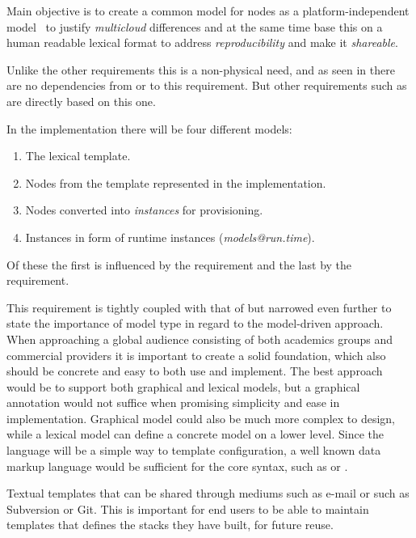 Main objective is to create a common model for nodes as a platform-independent 
model~\cite{agile:cuong10} to justify \emph{multicloud} differences and 
at the same time base this on a human readable lexical format to address \emph{reproducibility} and
make it \emph{shareable}.

Unlike the other requirements this is a non-physical need, 
and as seen in 
there are no dependencies from or to this requirement.
But other requirements such as  are directly based on this one.

In the implementation there will be four different models:
\begin{enumerate}
  \item The lexical template.
  \item Nodes from the template represented in the implementation.
  \item Nodes converted into \emph{instances} for provisioning.
  \item Instances in form of runtime instances (\emph{models@run.time}).
\end{enumerate}
Of these the first is influenced by the  requirement and
the last by the  requirement.

This requirement is tightly coupled with that of  but narrowed 
even further to state the importance of model type in regard to the model-driven approach.
When approaching a global audience consisting of both academics groups and commercial
providers it is important to create a solid foundation, 
which also should be concrete and easy to both use and implement.
The best approach would be to support both graphical and lexical models, 
but a graphical annotation would not suffice when promising simplicity and ease in implementation. 
Graphical model could also be much more complex to design, 
while a lexical model can define a concrete model on a lower level.
Since the language will be a simple way to template configuration, 
a well known data markup language would be sufficient for the core syntax, such as 
 or .

Textual templates that can be shared through mediums such as e-mail or 
 such as Subversion or Git.
This is important for end users to be able to maintain templates that defines the stacks they have built, 
for future reuse.

